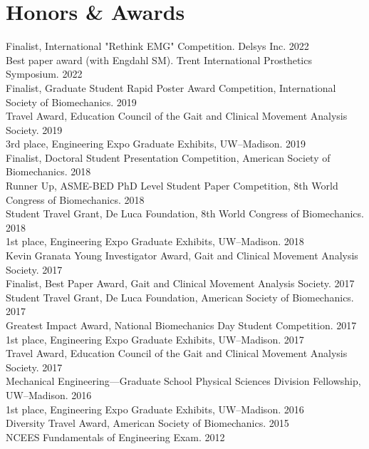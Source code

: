 \documentclass[letterpaper, 10pt]{article}
\begin{document}
\section{Honors \& Awards}

Finalist, International "Rethink EMG" Competition. Delsys Inc. \hfill 2022\\
Best paper award (with Engdahl SM). Trent International Prosthetics Symposium. \hfill 2022\\
Finalist, Graduate Student Rapid Poster Award Competition, International Society of Biomechanics. \hfill 2019\\
Travel Award, Education Council of the Gait and Clinical Movement Analysis Society. \hfill 2019\\
3rd place, Engineering Expo Graduate Exhibits, UW--Madison. \hfill 2019\\
Finalist, Doctoral Student Presentation Competition, American Society of Biomechanics. \hfill 2018\\
Runner Up, ASME-BED PhD Level Student Paper Competition, 8th World Congress of Biomechanics. \hfill 2018\\
Student Travel Grant, De Luca Foundation, 8th World Congress of Biomechanics. \hfill 2018\\
1st place, Engineering Expo Graduate Exhibits, UW--Madison. \hfill 2018\\
Kevin Granata Young Investigator Award, Gait and Clinical Movement Analysis Society. \hfill 2017\\
Finalist, Best Paper Award, Gait and Clinical Movement Analysis Society. \hfill 2017\\
Student Travel Grant, De Luca Foundation, American Society of Biomechanics. \hfill 2017\\
Greatest Impact Award, National Biomechanics Day Student Competition. \hfill 2017\\
1st place, Engineering Expo Graduate Exhibits, UW--Madison. \hfill 2017\\
Travel Award, Education Council of the Gait and Clinical Movement Analysis Society. \hfill 2017\\
Mechanical Engineering---Graduate School Physical Sciences Division Fellowship, UW--Madison. \hfill 2016\\
1st place, Engineering Expo Graduate Exhibits, UW--Madison. \hfill 2016\\
Diversity Travel Award, American Society of Biomechanics. \hfill 2015\\
NCEES Fundamentals of Engineering Exam. \hfill 2012\\
\end{document}
